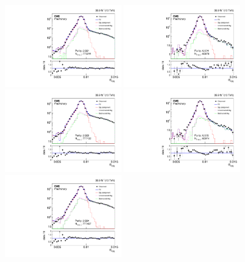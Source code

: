 \begin{figure}[htbp]
  \centering
  \includegraphics[width=0.45\textwidth]{Calibration/Figures/pvsf/ssfit_175_medium_near_logy.pdf}
  \includegraphics[width=0.45\textwidth]{Calibration/Figures/pvsf/ssfit_400_medium_near_logy.pdf}
  \includegraphics[width=0.45\textwidth]{Calibration/Figures/pvsf/ssfit_175_medium_nominal_logy.pdf}
  \includegraphics[width=0.45\textwidth]{Calibration/Figures/pvsf/ssfit_400_medium_nominal_logy.pdf}
  \includegraphics[width=0.45\textwidth]{Calibration/Figures/pvsf/ssfit_175_medium_far_logy.pdf}

\end{figure}
